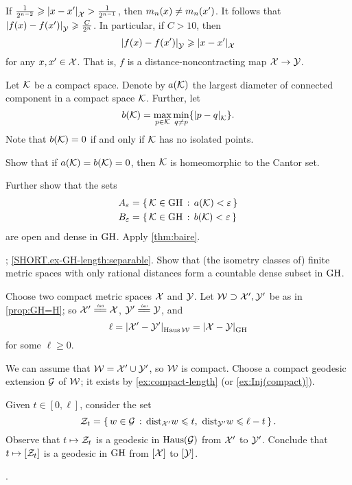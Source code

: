 If $\tfrac1{2^{n-2}}\ge \dist{x}{x'}{\spc{X}}>\tfrac1{2^{n-1}}$, then $m_n(x)\z\ne m_n(x')$.
It follows that $\dist{f(x)}{f(x')}{\spc{Y}}\ge \tfrac C{2^{n}}$.
In particular, if $C>10$, then 
\[\dist{f(x)}{f(x')}{\spc{Y}}\ge \dist{x}{x'}{\spc{X}}\]
for any $x,x'\in \mathcal{X}$.
That is, $f$ is a distance-noncontracting map $\mathcal{X}\to \mathcal{Y}$.

Let $\mathcal{K}$ be a compact space.
Denote by $a(\mathcal{K})$ the largest diameter of connected component in a compact space $\mathcal{K}$.
Further, let 
\[b(\spc{K})=\max_{p\in \spc{K}}\min_{q\ne p}\{\dist{p}{q}{\spc{K}}\}.\]
Note that $b(\mathcal{K})=0$ if and only if $\mathcal{K}$ has no isolated points.

Show that if $a(\mathcal{K})=b(\mathcal{K})=0$, then $\mathcal{K}$ is homeomorphic to the Cantor set.

Further show that the sets
\begin{align*}
A_\varepsilon&=\left\{\,{\mathcal{K}\in\operatorname{\rm GH}\nolimits}\,:\,{a(\mathcal{K})<\varepsilon}\,\right\}
\\
B_\varepsilon&=\left\{\,{\mathcal{K}\in\operatorname{\rm GH}\nolimits}\,:\,{b(\mathcal{K})<\varepsilon}\,\right\}
\end{align*}
are open and dense in $\operatorname{\rm GH}\nolimits$.
Apply \ref{thm:baire}.



\parbf{\ref{ex-GH-length}}; \ref{SHORT.ex-GH-length:separable}.
Show that (the isometry classes of) finite metric spaces with only rational distances form a countable dense subset in $\operatorname{\rm GH}\nolimits$. 

Choose two compact metric spaces $\mathcal{X}$ and $\mathcal{Y}$.
Let $\mathcal{W}\supset \mathcal{X}',\mathcal{Y}'$ be as in \ref{prop:GH=H};
so $\spc{X}'\iso \spc{X}$, $\spc{Y}'\iso \spc{Y}$, and
\[\ell=\dist{\spc{X}'}{\spc{Y}'}{\Haus\spc{W}}=\dist{\spc{X}}{\spc{Y}}{\GH}\]
for some $\ell\ge 0$.

We can assume that $\mathcal{W}=\mathcal{X}'\cup\mathcal{Y}'$, so $\mathcal{W}$ is compact.
Choose a compact geodesic extension $\mathcal{G}$ of $\mathcal{W}$;
it exists by \ref{ex:compact-length} (or \ref{ex:Inj(compact)}).

Given $t\in[0,\ell]$, consider the set
\[\mathcal{Z}_t=\left\{\,{w\in \mathcal{G}}\,:\,{\mathrm{dist}_{\mathcal{X}'}w\leqslant t,\  \mathrm{dist}_{\mathcal{Y}'}w\leqslant \ell-t}\,\right\}.\]
Observe that $t\mapsto \mathcal{Z}_t$ is a geodesic in $\operatorname{\rm Haus}\nolimits(\mathcal{G})$ from $\mathcal{X}'$ to $\mathcal{Y}'$.
Conclude that $t\mapsto [\mathcal{Z}_t]$ is a geodesic in $\operatorname{\rm GH}\nolimits$ from $[\mathcal{X}]$ to $[\mathcal{Y}]$.

 \cite{ivanov-nikolaeva-tuzhilin}.


